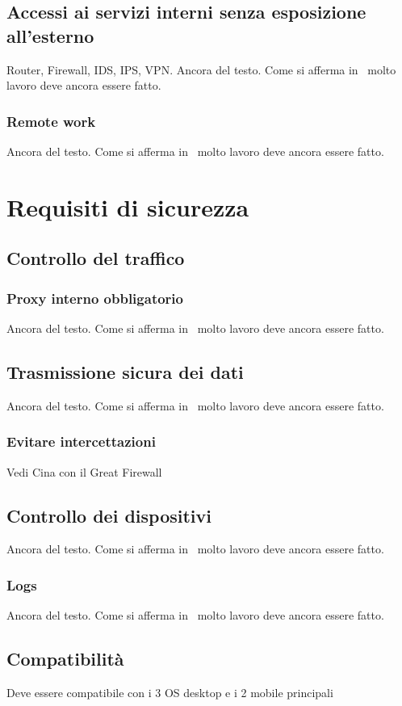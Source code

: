 \subsection{Accessi ai servizi interni senza esposizione all'esterno}
Router, Firewall, IDS, IPS, VPN. Ancora del testo. Come si afferma in~\cite{jones96analysis} molto lavoro deve ancora essere fatto.
\subsubsection{Remote work}
Ancora del testo. Come si afferma in~\cite{jones96analysis} molto lavoro deve ancora essere fatto.

\section{Requisiti di sicurezza}
\subsection{Controllo del traffico}
\subsubsection{Proxy interno obbligatorio}
Ancora del testo. Come si afferma in~\cite{jones96analysis} molto lavoro deve ancora essere fatto.

\subsection{Trasmissione sicura dei dati}
Ancora del testo. Come si afferma in~\cite{jones96analysis} molto lavoro deve ancora essere fatto.
\subsubsection{Evitare intercettazioni}
Vedi Cina con il Great Firewall

\subsection{Controllo dei dispositivi}
Ancora del testo. Come si afferma in~\cite{jones96analysis} molto lavoro deve ancora essere fatto.
\subsubsection{Logs}
Ancora del testo. Come si afferma in~\cite{jones96analysis} molto lavoro deve ancora essere fatto.

\subsection{Compatibilità}
Deve essere compatibile con i 3 OS desktop e i 2 mobile principali